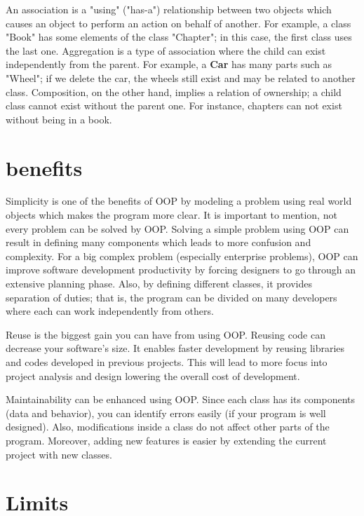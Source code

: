 \documentclass[12pt]{book}
\begin{document}
An association is a "using" ("has-a") relationship between two objects which causes an object to perform an action on behalf of another. 
For example, a class "Book" has some elements of the class "Chapter"; in this case, the first class uses the last one.
Aggregation is a type of association where the child can exist independently from the parent.
For example, a \textbf{Car} has many parts such as "Wheel"; if we delete the car, the wheels still exist and may be related to another class. 
Composition, on the other hand, implies a relation of ownership; a child class cannot exist without the parent one.
For instance, chapters can not exist without being in a book.

\section{benefits}


Simplicity is one of the benefits of OOP by modeling a problem using real world objects which makes the program more clear.
It is important to mention, not every problem can be solved by OOP. 
Solving a simple problem using OOP can result in defining many components which leads to more confusion and complexity. 
For a big complex problem (especially enterprise problems), OOP can improve software development productivity by forcing designers to go through an extensive planning phase. 
Also, by defining different classes, it provides separation of duties; that is, the program can be divided on many developers where each can work independently from others.


Reuse is the biggest gain you can have from using OOP. 
Reusing code can decrease your software's size. 
It enables faster development by reusing libraries and codes developed in previous projects. 
This will lead to more focus into project analysis and design lowering the overall cost of development. 

Maintainability can be enhanced using OOP. 
Since each class has its components (data and behavior), you can identify errors easily (if your program is well designed).
Also, modifications inside a class do not affect other parts of the program. 
Moreover, adding new features is easier by extending the current project with new classes.

\section{Limits}
\end{document}
